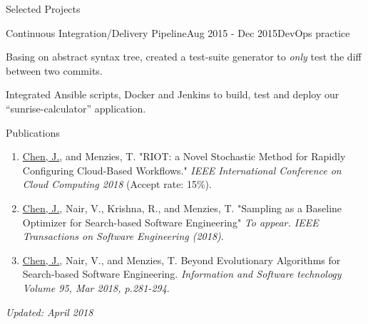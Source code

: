 \documentclass{resume} %
\begin{document}
\begin{rSection}{Selected Projects}
\begin{rSubsection}{Continuous Integration/Delivery Pipeline}{Aug 2015 - Dec 2015}{DevOps practice}{} 
\item Basing on abstract syntax tree, created a test-suite generator to \textit{only} test the diff between two commits.
\item Integrated Ansible scripts, Docker and Jenkins to build, test and deploy our        ``sunrise-calculator'' application.
\end{rSubsection}

\end{rSection} 

\begin{rSection}{ Publications} 
\begin{enumerate}[wide, labelwidth=!, labelindent=0pt]
\item \underline{Chen, J.}, and Menzies, T. "RIOT: a Novel Stochastic Method for Rapidly Configuring Cloud-Based Workflows." \textit{IEEE International Conference on Cloud Computing 2018} (Accept rate: 15\%).
\item \underline{Chen, J.}, Nair, V., Krishna, R., and Menzies, T. "Sampling as a Baseline Optimizer for Search-based Software Engineering" \textit{To appear. IEEE Transactions on Software Engineering (2018)}.
\item \underline{Chen, J.}, Nair, V., and  Menzies, T. Beyond Evolutionary Algorithms for Search-based Software Engineering. \textit{Information and Software technology Volume 95, Mar 2018, p.281-294}.
\end{enumerate}

\end{rSection}

\begin{flushright}
{\scriptsize \textit{Updated: April 2018}}
\end{flushright}
\end{document}
